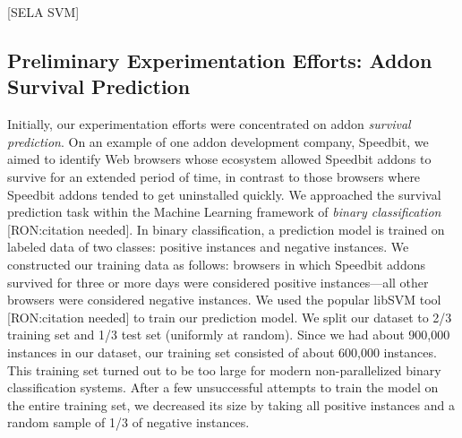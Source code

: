 \documentclass[11pt,oneside]{book}
\let\Oldsubsection\subsection
\renewcommand{\subsection}{\FloatBarrier\Oldsubsection}
\begin{document}

[SELA SVM]
\subsection{Preliminary Experimentation Efforts: Addon Survival Prediction}
Initially, our experimentation efforts were concentrated on addon \emph{survival prediction}. On an example of one addon development company, Speedbit, we aimed to identify Web browsers whose ecosystem allowed Speedbit addons to survive for an extended period of time, in contrast to those browsers where Speedbit addons tended to get uninstalled quickly. We approached the survival prediction task within the Machine Learning framework of \emph{binary classification} [RON:citation needed]. In binary classification, a prediction model is trained on labeled data of two classes: positive instances and negative instances. We constructed our training data as follows: browsers in which Speedbit addons survived for three or more days were considered positive instances---all other browsers were considered negative instances. We used the popular libSVM tool [RON:citation needed] to train our prediction model.
We split our dataset to 2/3 training set and 1/3 test set (uniformly at random). Since we had about 900,000 instances in our dataset, our training set consisted of about 600,000 instances. This training set turned out to be too large for modern non-parallelized binary classification systems. After a few unsuccessful attempts to train the model on the entire training set, we decreased its size by taking all positive instances and a random sample of 1/3 of negative instances.

\end{document}
